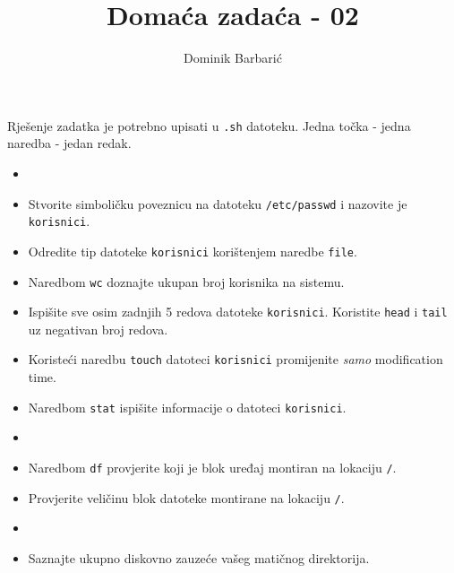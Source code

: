 \documentclass[12pt,a4paper]{article}
\newcommand{\shell}[1]{\texttt{#1}}
\begin{document}
	\title{Domaća zadaća - 02}
	\author{Dominik Barbarić}
	\maketitle
	Rješenje zadatka je potrebno upisati u \shell{.sh} datoteku. Jedna točka - jedna naredba - jedan redak.
	\begin{itemize}
	\item[]
		\item Stvorite simboličku poveznicu na datoteku \shell{/etc/passwd} i nazovite je \shell{korisnici}.
		\item Odredite tip datoteke \shell{korisnici} korištenjem naredbe \shell{file}.
		\item Naredbom \shell{wc} doznajte ukupan broj korisnika na sistemu.
		\item Ispišite sve osim zadnjih 5 redova datoteke \shell{korisnici}. Koristite \shell{head} i \shell{tail} uz negativan broj redova.
		\item Koristeći naredbu \shell{touch} datoteci \shell{korisnici} promijenite \emph{samo} modification time.
		\item Naredbom \shell{stat} ispišite informacije o datoteci \shell{korisnici}.
		\item[]
		\item Naredbom \shell{df} provjerite koji je blok uređaj montiran na lokaciju \shell{/}.
		\item Provjerite veličinu blok datoteke montirane na lokaciju \shell{/}.
		\item[]
		\item Saznajte ukupno diskovno zauzeće vašeg matičnog direktorija.
	\end{itemize}
\end{document}
